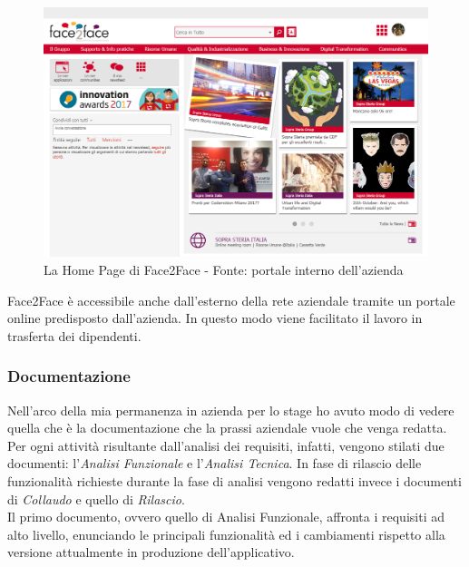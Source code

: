 	\begin{figure}[H]
		\centering
	   	\includegraphics[width=1\textwidth]{immagini/Face2Face}
	   	\caption{La Home Page di Face2Face - Fonte: portale interno dell'azienda}
	\end{figure}
		
	Face2Face è accessibile anche dall'esterno della rete aziendale tramite un portale online predisposto dall'azienda. In questo modo viene facilitato il lavoro in trasferta dei dipendenti.\\
	
	\subsubsection{Documentazione}
	
	Nell'arco della mia permanenza in azienda per lo stage ho avuto modo di vedere quella che è la documentazione che la prassi aziendale vuole che venga redatta. Per ogni attività risultante dall'analisi dei requisiti, infatti, vengono stilati due documenti: l'\textit{Analisi Funzionale} e l'\textit{Analisi Tecnica}. In fase di rilascio delle funzionalità richieste durante la fase di analisi vengono redatti invece i documenti di \textit{Collaudo} e quello di \textit{Rilascio}.\\
	
	Il primo documento, ovvero quello di Analisi Funzionale, affronta i requisiti ad alto livello, enunciando le principali funzionalità ed i cambiamenti rispetto alla versione attualmente in produzione dell'applicativo.\\
	
	\leavevmode	\newline

